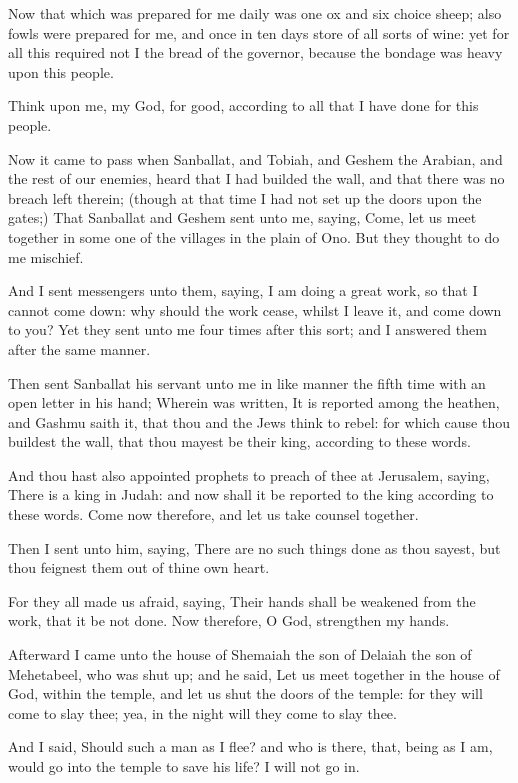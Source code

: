 \Verse Now that which was prepared for me daily was one ox and six choice sheep; also fowls were prepared for me, and once in ten days store of all sorts of wine: yet for all this required not I the bread of the governor, because the bondage was heavy upon this people.

\Verse Think upon me, my God, for good, according to all that I have done for this people.


\Chapter
\Verse Now it came to pass when Sanballat, and Tobiah, and Geshem the Arabian, and the rest of our enemies, heard that I had builded the wall, and that there was no breach left therein; (though at that time I had not set up the doors upon the gates;) \Verse That Sanballat and Geshem sent unto me, saying, Come, let us meet together in some one of the villages in the plain of Ono. But they thought to do me mischief.

\Verse And I sent messengers unto them, saying, I am doing a great work, so that I cannot come down: why should the work cease, whilst I leave it, and come down to you?  \Verse Yet they sent unto me four times after this sort; and I answered them after the same manner.

\Verse Then sent Sanballat his servant unto me in like manner the fifth time with an open letter in his hand; \Verse Wherein was written, It is reported among the heathen, and Gashmu saith it, that thou and the Jews think to rebel: for which cause thou buildest the wall, that thou mayest be their king, according to these words.

\Verse And thou hast also appointed prophets to preach of thee at Jerusalem, saying, There is a king in Judah: and now shall it be reported to the king according to these words. Come now therefore, and let us take counsel together.

\Verse Then I sent unto him, saying, There are no such things done as thou sayest, but thou feignest them out of thine own heart.

\Verse For they all made us afraid, saying, Their hands shall be weakened from the work, that it be not done. Now therefore, O God, strengthen my hands.

\Verse Afterward I came unto the house of Shemaiah the son of Delaiah the son of Mehetabeel, who was shut up; and he said, Let us meet together in the house of God, within the temple, and let us shut the doors of the temple: for they will come to slay thee; yea, in the night will they come to slay thee.

\Verse And I said, Should such a man as I flee? and who is there, that, being as I am, would go into the temple to save his life? I will not go in.


